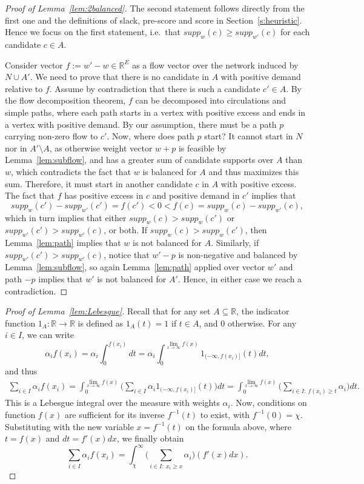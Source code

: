 \begin{proof}[Proof of Lemma~\ref{lem:2balanced}]
The second statement follows directly from the first one and the definitions of slack, pre-score and score in Section~\ref{s:heuristic}. Hence we focus on the first statement, i.e.~that $supp_w(c)\geq supp_{w'}(c)$ for each candidate $c\in A$.

Consider vector $f:=w'-w\in\mathbb{R}^E$ as a flow vector over the network induced by $N\cup A'$. We need to prove that there is no candidate in $A$ with positive demand relative to $f$. Assume by contradiction that there is such a candidate $c'\in A$. By the flow decomposition theorem, $f$ can be decomposed into circulations and simple paths, where each path starts in a vertex with positive excess and ends in a vertex with positive demand. By our assumption, there must be a path $p$ carrying non-zero flow to $c'$.  
Now, where does path $p$ start? It cannot start in $N$ nor in $A'\setminus A$, as otherwise weight vector $w+p$ is feasible by Lemma~\ref{lem:subflow}, and has a greater sum of candidate supports over $A$ than $w$, which contradicts the fact that $w$ is balanced for $A$ and thus maximizes this sum. Therefore, it must start in another candidate $c$ in $A$ with positive excess. 
The fact that $f$ has positive excess in $c$ and positive demand in $c'$ implies that
$$supp_{w}(c') - supp_{w'}(c') = f(c')< 0 < f(c) = supp_{w}(c) - supp_{w'}(c),$$
which in turn implies that either $supp_w(c) > supp_w(c')$ or $supp_{w'}(c') > supp_{w'}(c)$, or both. 
If $supp_w(c) > supp_w(c')$, then Lemma~\ref{lem:path} implies that $w$ is not balanced for $A$. 
Similarly, if $supp_{w'}(c') > supp_{w'}(c)$, notice that $w'-p$ is non-negative and balanced by Lemma~\ref{lem:subflow}, so again Lemma~\ref{lem:path} applied over vector $w'$ and path $-p$ implies that $w'$ is not balanced for $A'$. Hence, in either case we reach a contradiction.
\end{proof}

\begin{proof}[Proof of Lemma~\ref{lem:Lebesgue}]
Recall that for any set $A\subseteq \mathbb{R}$, the indicator function $1_A:\mathbb{R}\rightarrow \mathbb{R}$ is defined as $1_A(t)=1$ if $t\in A$, and $0$ otherwise. For any $i\in I$, we can write
$$\alpha_i f(x_i) = \alpha_i \int_{0}^{f(x_i)} dt = \alpha_i\int_0^{\lim_{x\rightarrow \infty} f(x)} 1_{(-\infty, f(x_i)]}(t)dt,$$
and thus
\begin{align*}
    \sum_{i\in I} \alpha_i f(x_i) = \int_0^{\lim_{x\rightarrow \infty} f(x)} \Big(\sum_{i\in I} \alpha_i 1_{(-\infty, f(x_i)]}(t)\Big)dt = \int_0^{\lim_{x\rightarrow \infty} f(x)} \Big(\sum_{i\in I: \ f(x_i)\geq t} \alpha_i \Big)dt.
\end{align*}
This is a Lebesgue integral over the measure with weights $\alpha_i$. Now, conditions on function $f(x)$ are sufficient for its inverse $f^{-1}(t)$ to exist, with $f^{-1}(0)=\chi$. Substituting with the new variable $x=f^{-1}(t)$ on the formula above, where $t=f(x)$ and $dt=f'(x)dx$, we finally obtain
$$\sum_{i\in I} \alpha_i f(x_i) =\int_{\chi}^{\infty} \Big( \sum_{i\in I: \ x_i\geq x} \alpha_i \Big)(f'(x)dx).$$
\end{proof}

